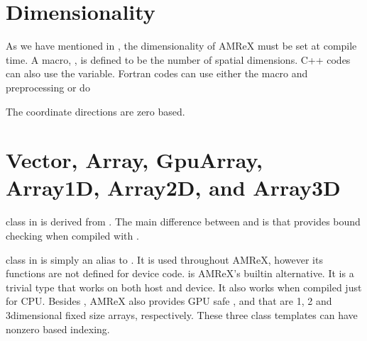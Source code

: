 \documentclass[letterpaper,10pt,english]{sphinxmanual}
\begin{document}
\section{Dimensionality}
\label{\detokenize{Basics:dimensionality}}\label{\detokenize{Basics:sec-basics-dim}}\label{\detokenize{Basics::doc}}
\sphinxAtStartPar
As we have mentioned in {\hyperref[\detokenize{BuildingAMReX_Chapter:chap-buildingamrex}]{}}, the dimensionality of
AMReX must be set at compile time. A macro, , is defined to
be the number of spatial dimensions. C++ codes can also use the
 variable. Fortran codes can use either the macro and
preprocessing or do

\begin{sphinxVerbatim}[commandchars=\\\{\}]
   
\end{sphinxVerbatim}

\sphinxAtStartPar
The coordinate directions are zero based.


\section{Vector, Array, GpuArray, Array1D, Array2D, and Array3D}
\label{\detokenize{Basics:vector-array-gpuarray-array1d-array2d-and-array3d}}\label{\detokenize{Basics:sec-basics-vecandarr}}
\sphinxAtStartPar
{} class in  is derived from . The
main difference between  and  is that
 provides bound checking when compiled with
.

\sphinxAtStartPar
{} class in  is simply an alias to .
It is used throughout AMReX, however its functions are not defined
for device code.  is AMReX’s built\sphinxhyphen{}in alternative.  It
is a trivial type that works on both host and device.  It also works
when compiled just for CPU.  Besides , AMReX also
provides GPU safe ,  and  that are
1, 2 and 3\sphinxhyphen{}dimensional fixed size arrays, respectively.  These three
class templates can have non\sphinxhyphen{}zero based indexing.
\end{document}
